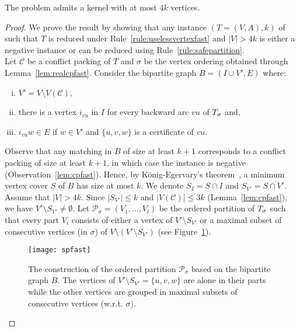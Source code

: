 \begin{theorem} \label{thm:fast}
The \FAST{} problem admits a kernel with at most $4k$ vertices.\end{theorem}
\begin{proof}
We prove the result by showing that any instance $(T = (V,A), k)$ of \FAST{} such that $T$ is reduced under Rule~\ref{rule:uselessvertexfast} and $|V| > 4k$ is either a negative instance or can be reduced using Rule~\ref{rule:safepartition}. \\ 

Let $\mathcal{C}$ be a conflict packing of $T$ and $\sigma$ be the vertex ordering obtained through Lemma~\ref{lem:realcpfast}. 
Consider the bipartite graph $B = (I \cup V', E)$ where:
\begin{enumerate}[(i)]
\item $V' = V \setminus V(\mathcal{C})$, 
\vspace{-0.2cm}
\item there is a vertex $i_{vu}$ in $I$ for every backward arc $vu$ of $T_{\sigma}$ and, 
\vspace{-0.2cm}
\item $i_{vu}w \in E$ if $w \in V'$ and $\{u,v,w\}$ is a certificate of $vu$.
\end{enumerate}	 
	
Observe that any matching in $B$ of size at least $k+1$ corresponds to a conflict packing of size at least $k+1$, in which case the instance is negative (Observation~\ref{lem:cpfast}). Hence, by K\"onig-Egervary's theorem~\cite{BM76}, a minimum vertex cover $S$ of $B$ has size at most $k$. We denote $S_I=S\cap I$ and $S_{V'}=S\cap V'$.
Assume that $|V| > 4k$. Since $|S_{V'}| \leqslant k$ and  $|V(\mathcal{C})| \leqslant 3k$ (Lemma~\ref{lem:cpfast}), we have 
$V' \setminus S_{V'} \neq \emptyset$. Let $\mathcal{P}_\sigma=(V_1, \dots, V_l)$ be the ordered partition of $T_{\sigma}$ such that every part $V_i$ consists of either a vertex of $V' \setminus S_{V'}$ or a maximal subset of consecutive vertices (in $\sigma$) of $V\setminus (V' \setminus S_{V'})$ (see Figure~\ref{fig:spfast}).

\begin{figure}[h]
\centerline{\texttt{[image: spfast]}}
\caption{The construction of the ordered partition $\mathcal{P}_\sigma$ based on the bipartite graph $B$. The vertices of $V' \setminus S_{V'} = \{u,v,w\}$ are alone in their parts while the other vertices are grouped in maximal subsets of consecutive vertices (w.r.t. $\sigma)$.  \label{fig:spfast}}
\end{figure}


\end{proof}
